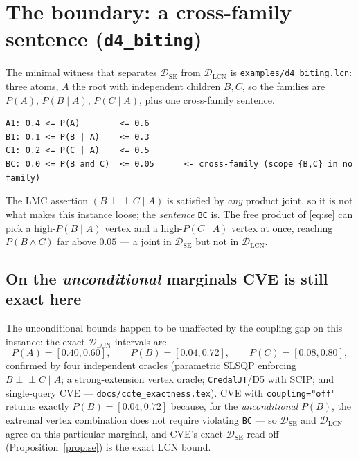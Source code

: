 \documentclass[11pt]{article}
\newcommand{\indep}{\perp\!\!\!\perp}
\newcommand{\DSE}{\mathcal{D}_{\mathrm{SE}}}
\newcommand{\DLCN}{\mathcal{D}_{\mathrm{LCN}}}
\begin{document}
\section{The boundary: a cross-family sentence (\texttt{d4\_biting})}\label{sec:boundary}

The minimal witness that separates $\DSE$ from $\DLCN$ is \texttt{examples/d4\_biting.lcn}: three
atoms, $A$ the root with independent children $B,C$, so the families are $P(A)$, $P(B\mid A)$,
$P(C\mid A)$, plus one cross-family sentence.
\begin{center}\small
\begin{verbatim}
A1: 0.4 <= P(A)        <= 0.6
B1: 0.1 <= P(B | A)    <= 0.3
C1: 0.2 <= P(C | A)    <= 0.5
BC: 0.0 <= P(B and C)  <= 0.05      <- cross-family (scope {B,C} in no family)
\end{verbatim}
\end{center}
The LMC assertion $(B\indep C\mid A)$ is satisfied by \emph{any} product joint, so it is not what
makes this instance loose; the \emph{sentence} \texttt{BC} is. The free product of \eqref{eq:se} can
pick a high-$P(B\mid A)$ vertex and a high-$P(C\mid A)$ vertex at once, reaching $P(B\land C)$ far
above $0.05$ --- a joint in $\DSE$ but not in $\DLCN$.

\subsection{On the \emph{unconditional} marginals CVE is still exact here}
The unconditional bounds happen to be unaffected by the coupling gap on this instance: the exact
$\DLCN$ intervals are
\[
  P(A)=[0.40,0.60],\qquad P(B)=[0.04,0.72],\qquad P(C)=[0.08,0.80],
\]
confirmed by four independent oracles (parametric SLSQP enforcing $B\indep C\mid A$; a
strong-extension vertex oracle; \texttt{CredalJT}/D5 with SCIP; and single-query CVE ---
\texttt{docs/ccte\_exactness.tex}). CVE with \texttt{coupling="off"} returns exactly $P(B)=[0.04,0.72]$
because, for the \emph{unconditional} $P(B)$, the extremal vertex combination does not require
violating \texttt{BC} --- so $\DSE$ and $\DLCN$ agree on this particular marginal, and CVE's exact
$\DSE$ read-off (Proposition~\ref{prop:se}) is the exact LCN bound.
\end{document}
